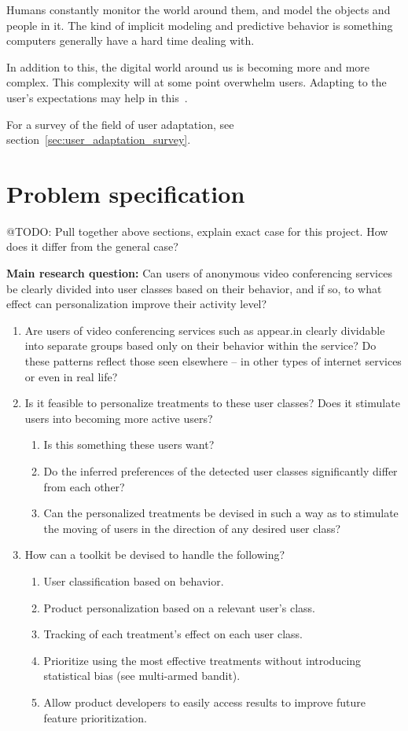 Humans constantly monitor the world around them, and model the objects and people in it. The kind of implicit modeling and predictive behavior is something computers generally have a hard time dealing with.

In addition to this, the digital world around us is becoming more and more complex. This complexity will at some point overwhelm users. Adapting to the user's expectations may help in this~\cite{Vrieze}.

For a survey of the field of user adaptation, see section~\ref{sec:user_adaptation_survey}.

\section{Problem specification}
\label{sec:problem_specification}

@TODO: Pull together above sections, explain exact case for this project. How does it differ from the general case?

\textbf{Main research question:} Can users of anonymous video conferencing services be clearly divided into user classes based on their behavior, and if so, to what effect can personalization improve their activity level?

\begin{enumerate}
  \item Are users of video conferencing services such as appear.in clearly dividable into separate groups based only on their behavior within the service? Do these patterns reflect those seen elsewhere -- in other types of internet services or even in real life?
  \item Is it feasible to personalize treatments to these user classes? Does it stimulate users into becoming more active users?
  \begin{enumerate}
    \item Is this something these users want?
    \item Do the inferred preferences of the detected user classes significantly differ from each other?
    \item Can the personalized treatments be devised in such a way as to stimulate the moving of users in the direction of any desired user class?
  \end{enumerate}
  \item How can a toolkit be devised to handle the following?
  \begin{enumerate}
    \item User classification based on behavior.
    \item Product personalization based on a relevant user's class.
    \item Tracking of each treatment's effect on each user class.
    \item Prioritize using the most effective treatments without introducing statistical bias (see multi-armed bandit).
    \item Allow product developers to easily access results to improve future feature prioritization.
  \end{enumerate}
\end{enumerate}

